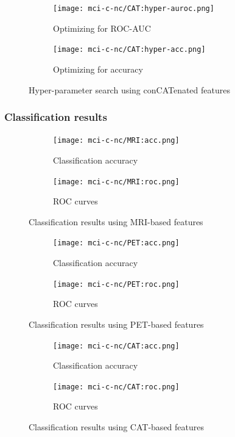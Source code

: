 \documentclass[12pt,a4paper]{article}
\begin{document}
\begin{figure}[H]
  \centering
  \begin{subfigure}[h]{0.49\textwidth}
    \texttt{[image: mci-c-nc/CAT:hyper-auroc.png]}
    \caption{Optimizing for ROC-AUC}  
  \end{subfigure}
  \begin{subfigure}[h]{0.49\textwidth}
    \texttt{[image: mci-c-nc/CAT:hyper-acc.png]}
    \caption{Optimizing for accuracy}  
  \end{subfigure}
  \caption{Hyper-parameter search using conCATenated features}
\end{figure}

\subsubsection{Classification results}
\label{sec:mci-c-nc-res}

\begin{figure}[H]
  \centering
  \begin{subfigure}[h]{0.49\textwidth}
    \texttt{[image: mci-c-nc/MRI:acc.png]}
    \caption{Classification accuracy}  
  \end{subfigure}
  \begin{subfigure}[h]{0.49\textwidth}
    \texttt{[image: mci-c-nc/MRI:roc.png]}
    \caption{ROC curves}  
  \end{subfigure}
  \caption{Classification results using MRI-based features}
\end{figure}

\begin{figure}[H]
  \centering
  \begin{subfigure}[h]{0.49\textwidth}
    \texttt{[image: mci-c-nc/PET:acc.png]}
    \caption{Classification accuracy}  
  \end{subfigure}
  \begin{subfigure}[h]{0.49\textwidth}
    \texttt{[image: mci-c-nc/PET:roc.png]}
    \caption{ROC curves}  
  \end{subfigure}
  \caption{Classification results using PET-based features}
\end{figure}

\begin{figure}[H]
  \centering
  \begin{subfigure}[h]{0.49\textwidth}
    \texttt{[image: mci-c-nc/CAT:acc.png]}
    \caption{Classification accuracy}  
  \end{subfigure}
  \begin{subfigure}[h]{0.49\textwidth}
    \texttt{[image: mci-c-nc/CAT:roc.png]}
    \caption{ROC curves}  
  \end{subfigure}
  \caption{Classification results using CAT-based features}
\end{figure}
\end{document}
